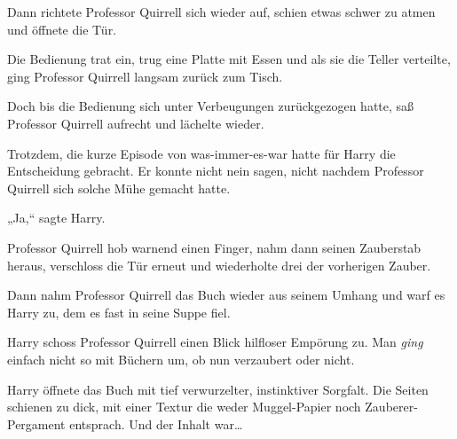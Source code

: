 Dann richtete Professor Quirrell sich wieder auf, schien etwas schwer zu atmen und öffnete die Tür.

Die Bedienung trat ein, trug eine Platte mit Essen und als sie die Teller verteilte, ging Professor Quirrell langsam zurück zum Tisch.

Doch bis die Bedienung sich unter Verbeugungen zurückgezogen hatte, saß Professor Quirrell aufrecht und lächelte wieder.

Trotzdem, die kurze Episode von was-immer-es-war hatte für Harry die Entscheidung gebracht. Er konnte nicht nein sagen, nicht nachdem Professor Quirrell sich solche Mühe gemacht hatte.

„Ja,“ sagte Harry.

Professor Quirrell hob warnend einen Finger, nahm dann seinen Zauberstab heraus, verschloss die Tür erneut und wiederholte drei der vorherigen Zauber.

Dann nahm Professor Quirrell das Buch wieder aus seinem Umhang und warf es Harry zu, dem es fast in seine Suppe fiel.

Harry schoss Professor Quirrell einen Blick hilfloser Empörung zu. Man \emph{ging} einfach nicht so mit Büchern um, ob nun verzaubert oder nicht.

Harry öffnete das Buch mit tief verwurzelter, instinktiver Sorgfalt. Die Seiten schienen zu dick, mit einer Textur die weder Muggel-Papier noch Zauberer-Pergament entsprach. Und der Inhalt war…

